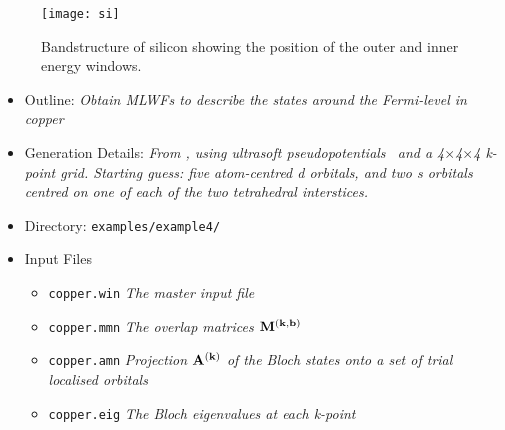 \documentclass[a4paper,11pt,twoside]{article}
\begin{document}
\begin{figure}[h]
\begin{center}
\texttt{[image: si]}
\caption{Bandstructure of silicon showing the position of the outer
  and inner energy windows.} 
\label{fig:si.bnd}
\end{center}
\end{figure}




\begin{itemize}
\item{Outline: \it{Obtain MLWFs to describe the states around the
    Fermi-level in copper}} 
\item{Generation Details: \it{From \pwscf, using ultrasoft
    pseudopotentials~\cite{vanderbilt-prb90} and a
    4$\times$4$\times$4 k-point grid. Starting guess: five 
    atom-centred d orbitals, and two s orbitals centred on one of each
    of the two tetrahedral interstices.}}
\item{Directory: {\tt examples/example4/}}
\item{Input Files}
\begin{itemize}
\item{ {\tt copper.win}  {\it The master input file}}
\item{ {\tt copper.mmn}  {\it The overlap matrices $\mathbf{M}^{(\mathbf{k},\mathbf{b})}$}}
\item{ {\tt copper.amn}  {\it Projection $\mathbf{A}^{(\mathbf{k})}$ of the Bloch states onto a
    set of trial localised orbitals}} 
\item{ {\tt copper.eig}  {\it The Bloch eigenvalues at each k-point}}
\end{itemize}

\end{itemize}
\end{document}
